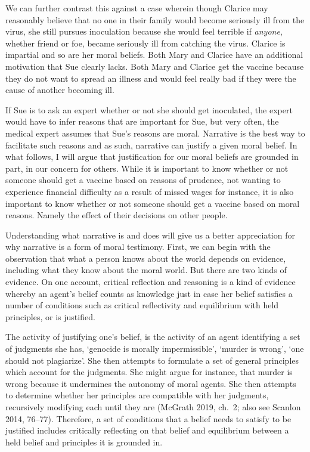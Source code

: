 \documentclass[12pt]{book}
\theoremstyle{definition}
\theoremstyle{remark}
\begin{document}
We can further contrast this against a case wherein though Clarice may reasonably believe that no one in their family would become seriously ill from the virus, she still pursues inoculation because she would feel terrible if \emph{anyone}, whether friend or foe, became seriously ill from catching the virus. Clarice is impartial and so are her moral beliefs. Both Mary and Clarice have an additional motivation that Sue clearly lacks. Both Mary and Clarice get the vaccine because they do not want to spread an illness and would feel really bad if they were the cause of another becoming ill.

If Sue is to ask an expert whether or not she should get inoculated, the expert would have to infer reasons that are important for Sue, but very often, the medical expert assumes that Sue's reasons are moral. Narrative is the best way to facilitate such reasons and as such, narrative can justify a given moral belief. In what follows, I will argue that justification for our moral beliefs are grounded in part, in our concern for others. While it is important to know whether or not someone should get a vaccine based on reasons of prudence, not wanting to experience financial difficulty as a result of missed wages for instance, it is also important to know whether or not someone should get a vaccine based on moral reasons. Namely the effect of their decisions on other people.

Understanding what narrative is and does will give us a better appreciation for why narrative is a form of moral testimony. First, we can begin with the observation that what a person knows about the world depends on evidence, including what they know about the moral world. But there are two kinds of evidence. On one account, critical reflection and reasoning is a kind of evidence whereby an agent's belief counts as knowledge just in case her belief satisfies a number of conditions such as critical reflectivity and equilibrium with held principles, or is justified.

The activity of justifying one's belief, is the activity of an agent identifying a set of judgments she has, `genocide is morally impermissible', `murder is wrong', `one should not plagiarize'. She then attempts to formulate a set of general principles which account for the judgments. She might argue for instance, that murder is wrong because it undermines the autonomy of moral agents. She then attempts to determine whether her principles are compatible with her judgments, recursively modifying each until they are (McGrath 2019, ch.~2; also see Scanlon 2014, 76--77). Therefore, a set of conditions that a belief needs to satisfy to be justified includes critically reflecting on that belief and equilibrium between a held belief and principles it is grounded in.
\end{document}
